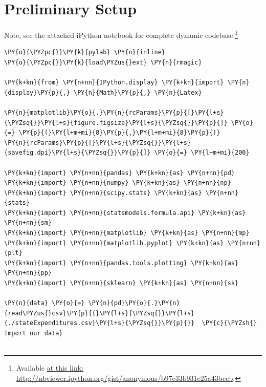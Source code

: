 \documentclass[10pt]{article}\usepackage[]{graphicx}\usepackage[]{xcolor}
\begin{document}
\newpage

\section*{Preliminary Setup}

Note, see the attached iPython notebook for complete dynamic codebase.\footnote{Available
    \href{http://nbviewer.ipython.org/gist/anonymous/b97c33b931e25a43bccb}{at this link: http://nbviewer.ipython.org/gist/anonymous/b97c33b931e25a43bccb}.}

    \begin{Verbatim}[commandchars=\\\{\}]
\PY{o}{\PYZpc{}}\PY{k}{pylab} \PY{n}{inline}
\PY{o}{\PYZpc{}}\PY{k}{load\PYZus{}ext} \PY{n}{rmagic}

\PY{k+kn}{from} \PY{n+nn}{IPython.display} \PY{k+kn}{import} \PY{n}{display}\PY{p}{,} \PY{n}{Math}\PY{p}{,} \PY{n}{Latex}

\PY{n}{matplotlib}\PY{o}{.}\PY{n}{rcParams}\PY{p}{[}\PY{l+s}{\PYZsq{}}\PY{l+s}{figure.figsize}\PY{l+s}{\PYZsq{}}\PY{p}{]} \PY{o}{=} \PY{p}{(}\PY{l+m+mi}{8}\PY{p}{,}\PY{l+m+mi}{8}\PY{p}{)}
\PY{n}{rcParams}\PY{p}{[}\PY{l+s}{\PYZsq{}}\PY{l+s}{savefig.dpi}\PY{l+s}{\PYZsq{}}\PY{p}{]} \PY{o}{=} \PY{l+m+mi}{200}

\PY{k+kn}{import} \PY{n+nn}{pandas} \PY{k+kn}{as} \PY{n+nn}{pd}
\PY{k+kn}{import} \PY{n+nn}{numpy} \PY{k+kn}{as} \PY{n+nn}{np}
\PY{k+kn}{import} \PY{n+nn}{scipy.stats} \PY{k+kn}{as} \PY{n+nn}{stats}
\PY{k+kn}{import} \PY{n+nn}{statsmodels.formula.api} \PY{k+kn}{as} \PY{n+nn}{sm}
\PY{k+kn}{import} \PY{n+nn}{matplotlib} \PY{k+kn}{as} \PY{n+nn}{mp}
\PY{k+kn}{import} \PY{n+nn}{matplotlib.pyplot} \PY{k+kn}{as} \PY{n+nn}{plt}
\PY{k+kn}{import} \PY{n+nn}{pandas.tools.plotting} \PY{k+kn}{as} \PY{n+nn}{pp}
\PY{k+kn}{import} \PY{n+nn}{sklearn} \PY{k+kn}{as} \PY{n+nn}{sk}

\PY{n}{data} \PY{o}{=} \PY{n}{pd}\PY{o}{.}\PY{n}{read\PYZus{}csv}\PY{p}{(}\PY{l+s}{\PYZsq{}}\PY{l+s}{./stateExpenditures.csv}\PY{l+s}{\PYZsq{}}\PY{p}{)}  \PY{c}{\PYZsh{} Import our data}


\end{Verbatim}
\end{document}
